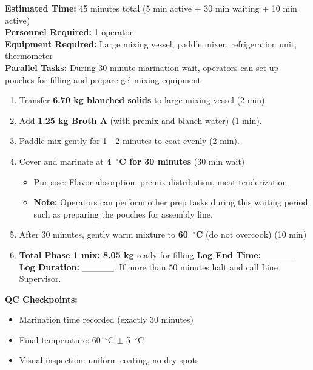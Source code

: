 {\textbf{Estimated Time:} 45 minutes total (5 min active + 30 min waiting + 10 min active) \\
\textbf{Personnel Required:} 1 operator \\
\textbf{Equipment Required:} Large mixing vessel, paddle mixer, refrigeration unit, thermometer \\
\textbf{Parallel Tasks:} During 30-minute marination wait, operators can set up pouches for filling and prepare gel mixing equipment

\begin{enumerate}[leftmargin=1.5em]
\textbf{Log Start Time in Timesheet:} \_\_\_\_\_
\textbf Ensure less than 5 minutes between End Time in Step 2/ Step 3 and Start Time in Step 4. 
\item Transfer \textbf{6.70 kg blanched solids} to large mixing vessel (2 min).  
\item Add \textbf{1.25 kg Broth A} (with premix and blanch water) (1 min). 
\item Paddle mix gently for 1---2 minutes to coat evenly (2 min). 
\item Cover and marinate at \textbf{4~$^\circ$C for 30 minutes} (30 min wait)
  \begin{itemize}
  \item Purpose: Flavor absorption, premix distribution, meat tenderization
  \item \textbf{Note:} Operators can perform other prep tasks during this waiting period such as preparing the pouches for assembly line. 
  \end{itemize}
\item After 30 minutes, gently warm mixture to \textbf{60~$^\circ$C} (do not overcook) (10 min)
\item \textbf{Total Phase 1 mix: 8.05 kg} ready for filling
\textbf{Log End Time:} \_\_\_\_\_
\textbf{Log Duration:} \_\_\_\_\_. If more than 50 minutes halt and call Line Supervisor. 
\end{enumerate}

\textbf{QC Checkpoints:}
\begin{itemize}
\item Marination time recorded (exactly 30 minutes)
\item Final temperature: 60~$^\circ$C $\pm$ 5~$^\circ$C
\item Visual inspection: uniform coating, no dry spots
\end{itemize}


}
